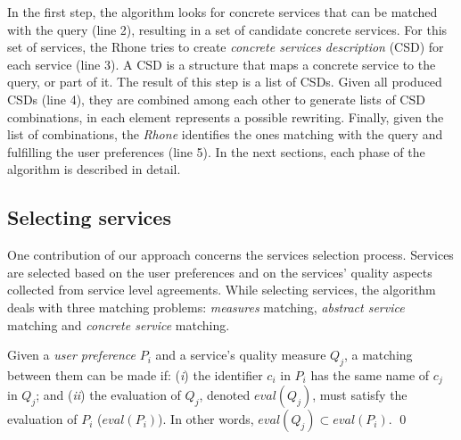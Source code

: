 In the first step, the algorithm looks for concrete services that 
can be matched with the query (line 2), resulting in a set of candidate concrete
services. For this set of services, the Rhone tries to create 
\textit{concrete services description} (CSD) for each service (line 3). 
A CSD is a structure that maps a concrete service to the query, or part of it. 
The  result of this step is a list of CSDs.
Given all produced CSDs  (line 4), they are combined among each other to
generate lists of CSD combinations, in each element represents a possible
rewriting.
Finally, given the list of combinations, the \textit{Rhone} identifies the
ones matching with the query and fulfilling the user preferences (line 5).
In the next sections, each phase of the algorithm is described in detail. 

\subsection{Selecting services}

One contribution of our approach concerns the services selection process. Services are selected based on the user preferences and on the services' quality aspects collected from service level agreements.
While selecting services, the algorithm deals with three matching problems: \textit{measures} matching, \textit{abstract service} matching and \textit{concrete service} matching.

\begin{definition}
Given a \textit{user preference} $P_{i}$ and a service's quality measure $Q_{j}$, a matching between them can be made if: (\textit{i}) the identifier $c_{i}$ in $P_{i}$ has the same name of $c_{j}$ in $Q_{j}$; and
(\textit{ii}) the evaluation of $Q_{j}$, denoted $eval(Q_{j})$, must satisfy the evaluation of $P_{i}$ ($eval(P_{i})$). In other words, $eval(Q_{j}) \subset eval(P_{i})$.
\qed
\end{definition}

